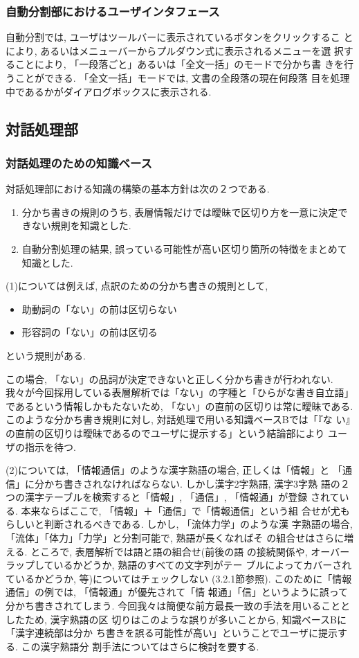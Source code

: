 \subsubsection{自動分割部におけるユーザインタフェース}
自動分割では, ユーザはツールバーに表示されているボタンをクリックするこ
とにより, あるいはメニューバーからプルダウン式に表示されるメニューを選
択することにより, 「一段落ごと」あるいは「全文一括」のモードで分かち書
きを行うことができる. 「全文一括」モードでは, 文書の全段落の現在何段落
目を処理中であるかがダイアログボックスに表示される. 

\subsection{対話処理部}
\subsubsection{対話処理のための知識ベース}
対話処理部における知識の構築の基本方針は次の２つである. 

\begin{enumerate}
\item { 分かち書きの規則のうち, 表層情報だけでは曖昧で区切り方を一意に決定できない規則を知識とした. }
\item{ 自動分割処理の結果, 誤っている可能性が高い区切り箇所の特徴をまとめて知識とした. }
\end{enumerate}

(1)については例えば, 点訳のための分かち書きの規則として, 
\begin{itemize}
\item{助動詞の「ない」の前は区切らない}
\item{形容詞の「ない」の前は区切る}
\end{itemize}
という規則がある. 

この場合, 「ない」の品詞が決定できないと正しく分かち書きが行われない. 
我々が今回採用している表層解析では「ない」の字種と「ひらがな書き自立語」
であるという情報しかもたないため, 「ない」の直前の区切りは常に曖昧である. 
このような分かち書き規則に対し, 対話処理で用いる知識ベースBでは「『な
い』の直前の区切りは曖昧であるのでユーザに提示する」という結論部により
ユーザの指示を待つ. 

(2)については, 「情報通信」のような漢字熟語の場合, 正しくは「情報」と
「通信」に分かち書きされなければならない. しかし漢字2字熟語, 漢字3字熟
語の２つの漢字テーブルを検索すると「情報」, 「通信」, 「情報通」が登録
されている. 本来ならばここで, 「情報」＋「通信」で「情報通信」という組
合せが尤もらしいと判断されるべきである. しかし, 「流体力学」のような漢
字熟語の場合, 「流体」「体力」「力学」と分割可能で, 熟語が長くなればそ
の組合せはさらに増える. ところで, 表層解析では語と語の組合せ(前後の語
の接続関係や, オーバーラップしているかどうか, 熟語のすべての文字列がテー
ブルによってカバーされているかどうか, 等)についてはチェックしない
(3.2.1節参照). このために「情報通信」の例では, 「情報通」が優先されて「情
報通」「信」というように誤って分かち書きされてしまう. 
今回我々は簡便な前方最長一致の手法を用いることとしたため, 漢字熟語の区
切りはこのような誤りが多いことから, 知識ベースBに「漢字連続部は分か
ち書きを誤る可能性が高い」ということでユーザに提示する. この漢字熟語分
割手法についてはさらに検討を要する. 

